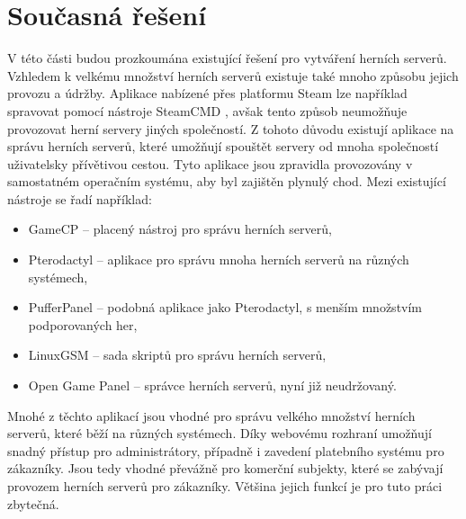 \chapter[Současná řešení]{Současná řešení}

V této části budou prozkoumána existující řešení pro vytváření herních serverů.
Vzhledem k velkému množství herních serverů existuje také mnoho způsobu jejich provozu a údržby. Aplikace nabízené přes platformu Steam
lze například spravovat pomocí nástroje SteamCMD \cite{steamcmd}, avšak tento způsob neumožňuje provozovat herní servery jiných společností.
Z tohoto důvodu existují aplikace na správu herních serverů, které umožňují spouštět servery od mnoha společností uživatelsky přívětivou cestou.
Tyto aplikace jsou zpravidla provozovány v samostatném operačním systému, aby byl zajištěn plynulý chod.
Mezi existující nástroje se řadí například:
\begin{itemize}
    \item GameCP -- placený nástroj pro správu herních serverů,
    \item Pterodactyl -- aplikace pro správu mnoha herních serverů na různých systémech,
    \item PufferPanel -- podobná aplikace jako Pterodactyl, s menším množstvím podporovaných her,
    \item LinuxGSM -- sada skriptů pro správu herních serverů,
    \item Open Game Panel -- správce herních serverů, nyní již neudržovaný.
\end{itemize}
Mnohé z těchto aplikací jsou vhodné pro správu velkého množství herních serverů, které běží na různých systémech. Díky webovému rozhraní umožňují snadný
přístup pro administrátory, případně i zavedení platebního systému pro zákazníky. Jsou tedy vhodné převážně pro komerční subjekty, které se zabývají
provozem herních serverů pro zákazníky. Většina jejich funkcí je pro tuto práci zbytečná.